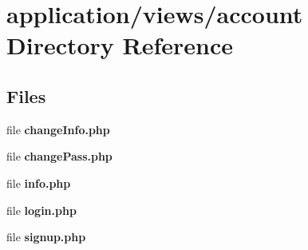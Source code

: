 \section{application/views/account Directory Reference}
\label{dir_8a904509c1c6748ca54ae30b2ddf9569}
\subsection*{Files}
\begin{DoxyCompactItemize}
\item 
file {\bf change\-Info.\-php}
\item 
file {\bf change\-Pass.\-php}
\item 
file {\bf info.\-php}
\item 
file {\bf login.\-php}
\item 
file {\bf signup.\-php}
\end{DoxyCompactItemize}
